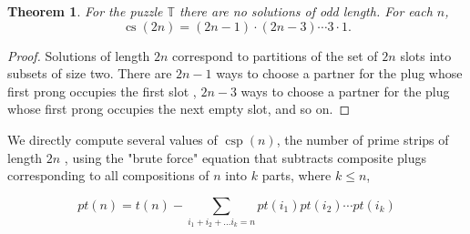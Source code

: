 \documentclass[10pt]{article}
\newtheorem{theorem}{Theorem}
\numberwithin{equation}{section}
\DeclareMathOperator{\cs}{cs} %
\DeclareMathOperator{\csp}{csp} %
\newenvironment{anote}
               {{\textcolor{blue}{Note:}}
                 \itshape
               }
               {}
\begin{document}
\begin{theorem}
For the puzzle $\mathbb{T}$ there are no solutions of odd length. For each $n$,
\begin{equation*}
    \cs(2n)=(2n-1) \cdot (2n-3) \cdots 3 \cdot 1.
\end{equation*}
\end{theorem}

\begin{proof}
Solutions of length $2n$ correspond to   partitions of the set of $2n$ slots into subsets of size two. There are $2n-1$ ways to choose a partner for the plug whose first prong occupies the first slot , $2n-3$ ways to choose a partner for the plug whose first prong occupies the next empty slot, and so on. 
\end{proof}


\begin{comment}
This is wrong but keeping for the LaTex when I rewrite: Note that the exponential generating function for $t(n) = \sum _{i} \dfrac{t(i)}{i!}x^i= e^{\frac{x^2}{2}}$.

\begin{anote}
Ethan. I rewrote this section up to this point. I think the next argument is really using the theorem that relates the total count to the count of primes.

When Deb or someone else reworks the rest of this section the they should work out counts of number of plugs (always $n$0 and number of prime plugs ?? 
\end{anote}

\begin{anote}
Probably in a paper, the above would just be referenced, but here's more on this for us. Look at the expansion $e^{\frac{x^2}{2}}= 1+ \dfrac{(\dfrac{x^2}{2})^1}{1!}+\dfrac{(\dfrac{x^2}{2})^2}{2!}+\dfrac{(\dfrac{x^2}{2})^3}{3!}+\cdots $  OK, I need to think about how to explain this better.... want to write up other parts now, but will go back to it later. Also I think I'm using the wrong latex commands for some of these, they don't look so good...
\end{anote} 
\end{comment}


We directly compute several values of $\csp(n)$, the number of prime strips of length $2n$ , using the "brute force" equation that subtracts composite plugs corresponding to all compositions of $n$ into $k$ parts, where $ k \leq n$, 

\begin{equation*}
    pt(n)=t(n)-\sum _{i_1+i_2 + \ldots i_k=n}pt(i_1)pt(i_2) \cdots pt(i_k)
\end{equation*}
\end{document}
